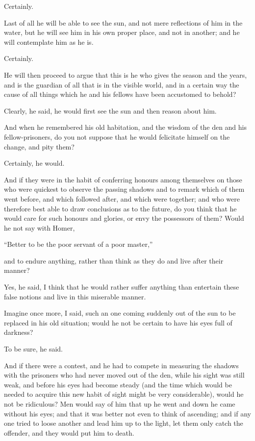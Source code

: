 Certainly.

Last of all he will be able to see the sun, and not mere reflections of
him in the water, but he will see him in his own proper place, and not
in another; and he will contemplate him as he is.

Certainly.

He will then proceed to argue that this is he who gives the season and
the years, and is the guardian of all that is in the visible world, and
in a certain way the cause of all things which he and his fellows have
been accustomed to behold?

Clearly, he said, he would first see the sun and then reason about him.

And when he remembered his old habitation, and the wisdom of the den
and his fellow-prisoners, do you not suppose that he would felicitate
himself on the change, and pity them?

Certainly, he would.

And if they were in the habit of conferring honours among themselves
on those who were quickest to observe the passing shadows and to remark
which of them went before, and which followed after, and which were
together; and who were therefore best able to draw conclusions as to the
future, do you think that he would care for such honours and glories, or
envy the possessors of them? Would he not say with Homer,

``Better to be the poor servant of a poor master,''

and to endure anything, rather than think as they do and live after
their manner?

Yes, he said, I think that he would rather suffer anything than
entertain these false notions and live in this miserable manner.

Imagine once more, I said, such an one coming suddenly out of the sun
to be replaced in his old situation; would he not be certain to have his
eyes full of darkness?

To be sure, he said.

And if there were a contest, and he had to compete in measuring the
shadows with the prisoners who had never moved out of the den, while
his sight was still weak, and before his eyes had become steady (and the
time which would be needed to acquire this new habit of sight might be
very considerable), would he not be ridiculous? Men would say of him
that up he went and down he came without his eyes; and that it was
better not even to think of ascending; and if any one tried to loose
another and lead him up to the light, let them only catch the offender,
and they would put him to death.


